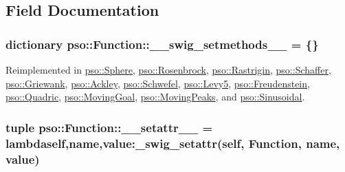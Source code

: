 \subsection{Field Documentation}
\hypertarget{classpso_1_1Function_2334bfe507115d58047f67960dde71d3}{
\subsubsection{\setlength{\rightskip}{0pt plus 5cm}dictionary {\bf pso::Function::\_\-\_\-swig\_\-setmethods\_\-\_\-} = \{\}}}
\label{classpso_1_1Function_2334bfe507115d58047f67960dde71d3}




Reimplemented in \hyperlink{classpso_1_1Sphere_9c2b9a1bd59f55c2010cbceda68c5916}{pso::Sphere}, \hyperlink{classpso_1_1Rosenbrock_7b19f06e4baa11a3daf3c6faccdb7241}{pso::Rosenbrock}, \hyperlink{classpso_1_1Rastrigin_6669f18ee53e453abd57a7414869091c}{pso::Rastrigin}, \hyperlink{classpso_1_1Schaffer_b037f1ad69b6619f1f89c7ba8e5de505}{pso::Schaffer}, \hyperlink{classpso_1_1Griewank_9d6ac056840192478ec5f46980eb1231}{pso::Griewank}, \hyperlink{classpso_1_1Ackley_8b601c932da42d58672496d0b982e333}{pso::Ackley}, \hyperlink{classpso_1_1Schwefel_c3b3a6c2afe3fd3d83656d02402cad2e}{pso::Schwefel}, \hyperlink{classpso_1_1Levy5_93d6c8d420b6ad862c41073e1764d31e}{pso::Levy5}, \hyperlink{classpso_1_1Freudenstein_d9e773221878926aafbb38d695a4017e}{pso::Freudenstein}, \hyperlink{classpso_1_1Quadric_5953ccca68eb821e48ff2953838604b7}{pso::Quadric}, \hyperlink{classpso_1_1MovingGoal_ec7da72a4fcf6a13f9f700b4dcf02b34}{pso::MovingGoal}, \hyperlink{classpso_1_1MovingPeaks_635671a6ae57a2c5d14d2ab1627f2f2c}{pso::MovingPeaks}, and \hyperlink{classpso_1_1Sinusoidal_7bdd3d830dd4d4cbe4481f4ac2f2db41}{pso::Sinusoidal}.\hypertarget{classpso_1_1Function_cd8775cf6aadc3fdf4e6d82158ef10fb}{
\subsubsection{\setlength{\rightskip}{0pt plus 5cm}tuple {\bf pso::Function::\_\-\_\-setattr\_\-\_\-} = lambdaself,name,value:\_\-swig\_\-setattr(self, {\bf Function}, name, value)}}
\label{classpso_1_1Function_cd8775cf6aadc3fdf4e6d82158ef10fb}




